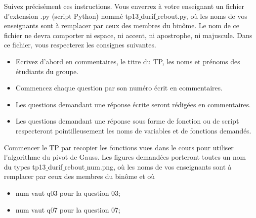 Suivez précisément ces instructions. Vous enverrez à votre enseignant un fichier d'extension .py (script Python) nommé
tp13$\_$durif$\_$rebout.py,
où les noms de vos enseignants sont à remplacer par ceux des membres du binôme. Le nom de ce fichier ne devra
comporter ni espace, ni accent, ni apostrophe, ni majuscule. Dans ce fichier, vous respecterez les consignes suivantes.

\begin{itemize}
\item Ecrivez d'abord en commentaires, le titre du TP, les noms et prénoms des étudiants du groupe.
\item Commencez chaque question par son numéro écrit en commentaires.
\item Les questions demandant une réponse écrite seront rédigées en commentaires.
\item Les questions demandant une réponse sous forme de fonction ou de script respecteront pointilleusement les
noms de variables et de fonctions demandés.
\end{itemize}

Commencer le TP par recopier les fonctions vues dans le cours pour utiliser l'algorithme du pivot de Gauss.
Les figures demandées porteront toutes un nom du types tp13$\_$durif$\_$rebout$\_$num.png, où les noms de
vos enseignants sont à remplacer par ceux des membres du binôme et où
\begin{itemize}
\item num vaut q03 pour la question 03;
\item num vaut q07 pour la question 07;
\end{itemize}
